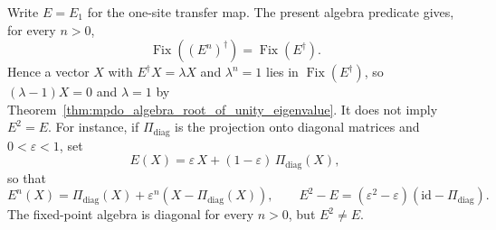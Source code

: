 \begin{remark}%
    \label{rem:mpdo_algebra_to_fusion_gap}
    Write $E=E_1$ for the one-site transfer map. The present algebra predicate
    gives, for every $n>0$,
    \[
        \operatorname{Fix}((E^n)^\dagger)
        = \operatorname{Fix}(E^\dagger).
    \]
    Hence a vector $X$ with $E^\dagger X=\lambda X$ and $\lambda^n=1$ lies in
    $\operatorname{Fix}(E^\dagger)$, so $(\lambda-1)X=0$ and $\lambda=1$ by
    Theorem~\ref{thm:mpdo_algebra_root_of_unity_eigenvalue}. It does not imply
    $E^2=E$. For instance, if $\Pi_{\mathrm{diag}}$ is the projection onto
    diagonal matrices and $0<\varepsilon<1$, set
    \[
        E(X)
        = \varepsilon\, X
        + (1 - \varepsilon)\, \Pi_{\mathrm{diag}}(X),
    \]
    so that
    \[
        E^n(X)
        = \Pi_{\mathrm{diag}}(X)
        + \varepsilon^n(X-\Pi_{\mathrm{diag}}(X)),
        \qquad
        E^2-E
        = (\varepsilon^2-\varepsilon)
        (\mathrm{id}-\Pi_{\mathrm{diag}}).
    \]
    The fixed-point algebra is diagonal for every $n>0$, but $E^2\ne E$.


\end{remark}
